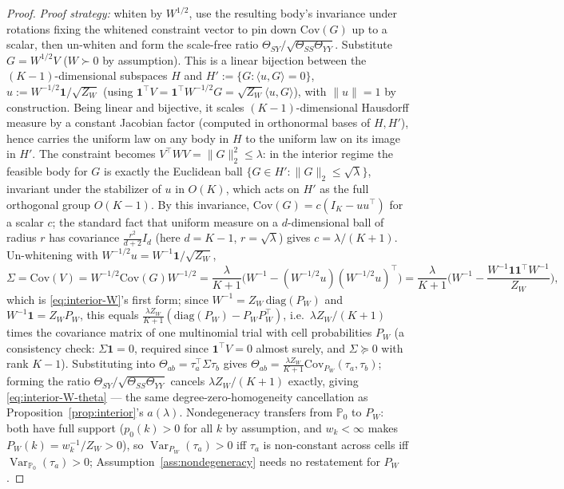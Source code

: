 \documentclass[11pt]{article}
\theoremstyle{plain}
\theoremstyle{definition}
\theoremstyle{remark}
\newcommand{\PP}{\mathbb{P}}
\newcommand{\Cov}{\mathrm{Cov}}
\DeclareMathOperator{\Var}{Var}
\begin{document}
\begin{proof}
\emph{Proof strategy:} whiten by $W^{1/2}$, use the resulting body's invariance under
rotations fixing the whitened constraint vector to pin down $\Cov(G)$ up to a scalar,
then un-whiten and form the scale-free ratio $\Theta_{SY}/\sqrt{\Theta_{SS}\Theta_{YY}}$.
Substitute $G=W^{1/2}V$ ($W\succ0$ by assumption). This is a linear bijection between
the $(K-1)$-dimensional subspaces $H$ and $H':=\{G:\langle u,G\rangle=0\}$,
$u:=W^{-1/2}\mathbf1/\sqrt{Z_W}$ (using $\mathbf1^\top V=\mathbf1^\top
W^{-1/2}G=\sqrt{Z_W}\langle u,G\rangle$), with $\|u\|=1$ by construction. Being linear
and bijective, it scales $(K-1)$-dimensional Hausdorff measure by a constant Jacobian
factor (computed in orthonormal bases of $H,H'$), hence carries the uniform law on any
body in $H$ to the uniform law on its image in $H'$. The constraint becomes
$V^\top WV=\|G\|_2^2\le\lambda$: in the interior regime the feasible body for $G$ is
exactly the Euclidean ball $\{G\in H':\|G\|_2\le\sqrt\lambda\}$, invariant under the
stabilizer of $u$ in $O(K)$, which acts on $H'$ as the full orthogonal group $O(K-1)$.
By this invariance, $\Cov(G)=c(I_K-uu^\top)$ for a scalar $c$; the standard fact that
uniform measure on a $d$-dimensional ball of radius $r$ has covariance
$\frac{r^2}{d+2}I_d$ (here $d=K-1$, $r=\sqrt\lambda$) gives $c=\lambda/(K+1)$.
Un-whitening with $W^{-1/2}u=W^{-1}\mathbf1/\sqrt{Z_W}$,
\[
    \Sigma=\Cov(V)=W^{-1/2}\Cov(G)W^{-1/2}
    =\frac\lambda{K+1}\Big(W^{-1}-(W^{-1/2}u)(W^{-1/2}u)^\top\Big)
    =\frac\lambda{K+1}\Big(W^{-1}-\frac{W^{-1}\mathbf1\mathbf1^\top W^{-1}}{Z_W}\Big),
\]
which is \eqref{eq:interior-W}'s first form; since $W^{-1}=Z_W\,\mathrm{diag}(P_W)$ and
$W^{-1}\mathbf1=Z_WP_W$, this equals $\frac{\lambda Z_W}{K+1}(\mathrm{diag}(P_W)-P_WP_W^\top)$,
i.e.\ $\lambda Z_W/(K+1)$ times the covariance matrix of one multinomial trial with cell
probabilities $P_W$ (a consistency check: $\Sigma\mathbf1=0$, required since
$\mathbf1^\top V=0$ almost surely, and $\Sigma\succeq0$ with rank $K-1$). Substituting
into $\Theta_{ab}=\tau_a^\top\Sigma\tau_b$ gives
$\Theta_{ab}=\frac{\lambda Z_W}{K+1}\Cov_{P_W}(\tau_a,\tau_b)$; forming the ratio
$\Theta_{SY}/\sqrt{\Theta_{SS}\Theta_{YY}}$ cancels $\lambda Z_W/(K+1)$ exactly, giving
\eqref{eq:interior-W-theta} --- the same degree-zero-homogeneity cancellation as
Proposition~\ref{prop:interior}'s $a(\lambda)$. Nondegeneracy transfers from $\PP_0$ to
$P_W$: both have full support ($p_0(k)>0$ for all $k$ by assumption, and $w_k<\infty$
makes $P_W(k)=w_k^{-1}/Z_W>0$), so $\Var_{P_W}(\tau_a)>0$ iff $\tau_a$ is non-constant
across cells iff $\Var_{\PP_0}(\tau_a)>0$; Assumption~\ref{ass:nondegeneracy} needs no
restatement for $P_W$.
\end{proof}
\end{document}
